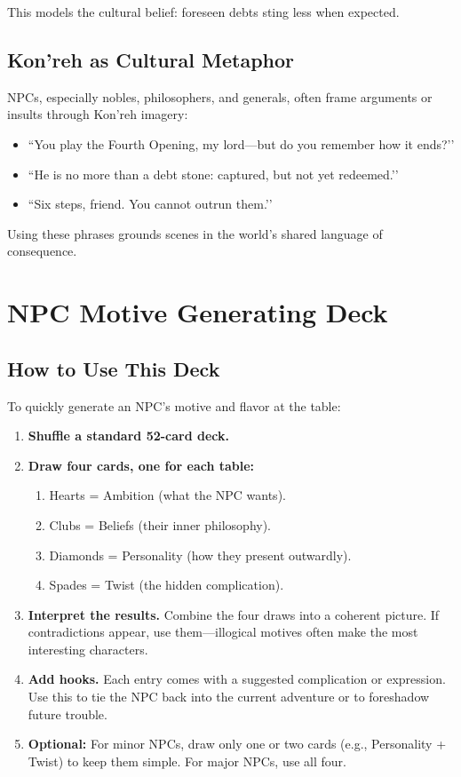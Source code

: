 \documentclass[12pt]{book}
\begin{document}
This models the cultural belief: foreseen debts sting less when expected.

\subsection{Kon’reh as Cultural Metaphor}
NPCs, especially nobles, philosophers, and generals, often frame arguments or insults through Kon’reh imagery:
\begin{itemize}
  \item ``You play the Fourth Opening, my lord—but do you remember how it ends?’’
  \item ``He is no more than a debt stone: captured, but not yet redeemed.’’
  \item ``Six steps, friend. You cannot outrun them.’’
\end{itemize}
Using these phrases grounds scenes in the world’s shared language of consequence.

\section{NPC Motive Generating Deck}

\subsection*{How to Use This Deck}

\noindent To quickly generate an NPC’s motive and flavor at the table:

\begin{enumerate}
  \item \textbf{Shuffle a standard 52-card deck.}
  \item \textbf{Draw four cards, one for each table:}
    \begin{enumerate}
      \item Hearts = Ambition (what the NPC wants).
      \item Clubs = Beliefs (their inner philosophy).
      \item Diamonds = Personality (how they present outwardly).
      \item Spades = Twist (the hidden complication).
    \end{enumerate}
  \item \textbf{Interpret the results.} Combine the four draws into a coherent picture. If contradictions appear, use them—illogical motives often make the most interesting characters.
  \item \textbf{Add hooks.} Each entry comes with a suggested complication or expression. Use this to tie the NPC back into the current adventure or to foreshadow future trouble.
  \item \textbf{Optional:} For minor NPCs, draw only one or two cards (e.g., Personality + Twist) to keep them simple. For major NPCs, use all four.
\end{enumerate}
\end{document}
